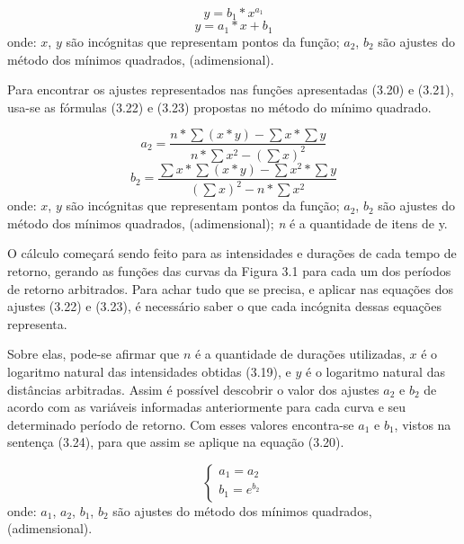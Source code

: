 \begin{equation}
y = b_1 * x^{a_1}
\end{equation}
\bigskip
\begin{equation}
y = a_{1} * x + b_{1}
\end{equation}
\newline
onde:
\newline
$x$, $y$ são incógnitas que representam pontos da função;
\newline
$a_2$, $b_2$ são ajustes do método dos mínimos quadrados, (adimensional).\bigskip

Para encontrar os ajustes representados nas funções apresentadas (3.20) e (3.21), usa-se as fórmulas (3.22) e (3.23) propostas no método do mínimo quadrado.\bigskip

\begin{equation}
a_2 = \frac{n * \sum{(x * y)} - \sum{x} * \sum{y}}{n * \sum{x^2} - (\sum{x})^2}
\end{equation}
\bigskip
\begin{equation}
b_2 = \frac{\sum{x} * \sum{(x * y)} - \sum{x^2} * \sum{y}}{(\sum{x})^2 - n * \sum{x^2}}
\end{equation}
\newline
onde:
\newline
$x$, $y$ são incógnitas que representam pontos da função;
\newline
$a_2$, $b_2$ são ajustes do método dos mínimos quadrados, (adimensional);
\newline
\textit{n} é a quantidade de itens de y.\bigskip

O cálculo começará sendo feito para as intensidades e durações de cada tempo de retorno, gerando as funções das curvas da Figura 3.1 para cada um dos períodos de retorno arbitrados. Para achar tudo que se precisa, e aplicar nas equações dos ajustes (3.22) e (3.23), é necessário saber o que cada incógnita dessas equações representa. 

Sobre elas, pode-se afirmar que $n$ é a quantidade de durações utilizadas, $x$ é o logaritmo natural das intensidades obtidas (3.19), e $y$ é o logaritmo natural das distâncias arbitradas. Assim é possível descobrir o valor dos ajustes $a_2$ e $b_2$ de acordo com as variáveis informadas anteriormente para cada curva e seu determinado período de retorno. Com esses valores encontra-se $a_1$ e $b_1$, vistos na sentença (3.24), para que assim se aplique na equação (3.20).\bigskip

\begin{equation}
\begin{cases}
a_1 = a_2 \\
b_1 = e^{b_2}
\end{cases}
\end{equation}
\newline
onde:
\newline
$a_1$, $a_2$, $b_1$, $b_2$ são ajustes do método dos mínimos quadrados, (adimensional).\bigskip

